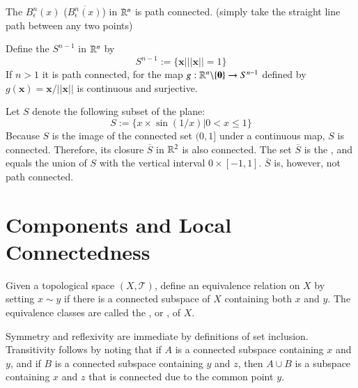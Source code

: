 \documentclass[12pt, a4paper, oneside, openright, titlepage]{book}
\begin{document}
\begin{example}
    The  $B^n_{\epsilon}(x)$ ($\overline{B^n_{\epsilon}(x)}$) in $\mathbb R^n$ is path connected. (simply take the straight line path between any two points)
\end{example}

\begin{example}
    Define the  $S^{n-1}$ in $\mathbb R^n$ by \begin{equation*}
        S^{n-1} := \{\mathbf{x}\vert||\mathbf{x}|| = 1\}
    \end{equation*}
    If $n >1$ it is path connected, for the map $g:\mathbb R^n\backslash\{\mathbf{0}\}\rightarrow S^{n-1}$ defined by $g(\mathbf{x}) = \mathbf{x}/||\mathbf{x}||$ is continuous and surjective.
\end{example}

\begin{example}
    Let $S$ denote the following subset of the plane: \begin{equation*}
        S := \{x\times \sin(1/x) \vert 0 < x \leq 1\}
    \end{equation*}
    Because $S$ is the image of the connected set $(0,1]$ under a continuous map, $S$ is connected. Therefore, its closure $\overline{S}$ in $\mathbb R^2$ is also connected. The set $\overline{S}$ is the , and equals the union of $S$ with the vertical interval $0\times [-1,1]$. $\overline{S}$ is, however, not path connected.
\end{example}




\section{Components and Local Connectedness}

\begin{definition}
    Given a topological space $(X,\mathcal{T})$, define an equivalence relation on $X$ by setting $x \sim y$ if there is a connected subspace of $X$ containing both $x$ and $y$. The equivalence classes are called the , or , of $X$.
\end{definition}

Symmetry and reflexivity are immediate by definitions of set inclusion. Transitivity follows by noting that if $A$ is a connected subspace containing $x$ and $y$, and if $B$ is a connected subspace containing $y$ and $z$, then $A\cup B$ is a subspace containing $x$ and $z$ that is connected due to the common point $y$.
\end{document}
